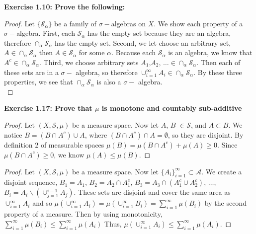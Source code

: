 \documentclass[letterpaper,12pt]{article}
\theoremstyle{definition}
\begin{document}
\noindent\textbf{Exercise 1.10:
Prove the following:}\\
\begin{proof}  Let $\{ \mathcal{S}_\alpha \}$ be a family of $\sigma-$algebras on $X$.  We show each property of a $\sigma-$algebra.  First, each $\mathcal{S}_\alpha$ has the empty set because they are an algebra, therefore $\cap_\alpha \mathcal{S}_\alpha$ has the empty set.  Second, we let choose an arbitrary set, $A \in \cap_\alpha \mathcal{S}_\alpha$ then $A \in \mathcal{S}_\alpha$ for some $\alpha$. Because each $\mathcal{S}_\alpha$ is an algebra, we know that $A^c \in \cap_\alpha \mathcal{S}_\alpha$.  Third, we choose arbitrary sets $A_1$,$ A_2$, $\dots \in \cap_\alpha \mathcal{S}_\alpha$.  Then each of these sets are in a $\sigma -$ algebra, so therefore $\cup_{i=1}^\infty A_i \in  \cap_\alpha \mathcal{S}_\alpha$.  By these three properties, we see that $\cap_\alpha \mathcal{S}_\alpha$ is also a $\sigma -$ algebra.\\
\end{proof}
\vspace{5mm}

\noindent\textbf{Exercise 1.17:
Prove that $\mu$ is monotone and countably sub-additive}\\
\begin{proof}  Let $( X, \mathcal{S}, \mu)$ be a measure space.
Now let $A$, $B$ $\in \mathcal{S}$, and $A \subset B$.  We notice $B=(B\cap A^c)\cup A$, where $(B\cap A^c) \cap A = \emptyset $, so they are disjoint.  By definition $2$ of measurable spaces $\mu (B) = \mu (B\cap A^c) + \mu (A) \ge 0$. Since $\mu(B\cap A^c)  \ge 0$, we know $\mu(A) \leq \mu(B)$.
\end{proof}

\begin{proof}
Let $( X, \mathcal{S}, \mu)$ be a measure space.  Now let $\{ A_i \}_{i=1}^\infty \subset \mathcal{A}$.  We create a disjoint sequence, $B_1 = A_1$, $B_2 = A_2 \cap A_1^c$, $B_3 = A_3 \cap (A_1^c \cup A_2^c)$, $\dots$, $B_i = A_i \smallsetminus (\cup_{j=1}^{i-1} A_j)$. These sets are disjoint and cover the same area as $\cup_{i=1}^\infty A_i$ and so $\mu (\cup_{i=1}^\infty A_i) = \mu (\cup_{i=1}^\infty B_i) = \sum_{i=1}^\infty \mu(B_i)$ by the second property of a measure.  Then by using monotonicity, $\sum_{i=1}^\infty \mu(B_i) \leq \sum_{i=1}^\infty \mu(A_i)$ Thus, $\mu (\cup_{i=1}^\infty A_i) \leq \sum_{i=1}^\infty \mu(A_i)$.
\end{proof}

\vspace{5mm}
\end{document}

